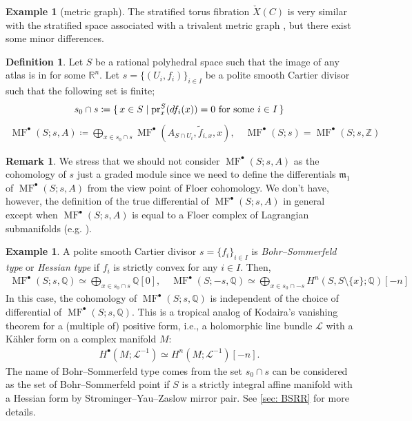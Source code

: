 \documentclass[a4paper,dvipdfmx,reqno,12pt]{amsart}
\theoremstyle{definition}
\newtheorem{Def}[Thm]{Definition}
\newtheorem{Eg}[Thm]{Example}
\newtheorem{Rmk}[Thm]{Remark}
\newcommand{\deq}{\coloneqq}
\newcommand{\R}{\mathbb{R}}%
\newcommand{\Q}{\mathbb{Q}}%
\newcommand{\Z}{\mathbb{Z}}%
\newcommand{\mcal}[1]{\mathcal{#1}}%
\newcommand{\mf}[1]{\mathfrak{#1}}%
\newcommand{\opn}[1]{\operatorname{#1}}
\numberwithin{equation}{section}
\begin{document}
\begin{Eg}[{metric graph}]
The stratified torus fibration $\check{X}(C)$ is very
similar with the stratified space associated
with a trivalent metric graph \cite{auroux2022lagrangian}, but
there exist some minor differences.
\end{Eg}

\begin{Def}
Let $S$ be a rational polyhedral space such that the image of
any atlas is in for some $\R^{n}$.
Let $s=\{(U_i,f_i)\}_{i\in I}$ be a polite smooth Cartier divisor such that
the following set is finite;
\begin{align}
s_0 \cap s\deq \set{x\in S\mid \opn{pr}_x^{S}(df_i(x))=0 
\text{ for some } i\in I}
\end{align}
\begin{align}
\opn{MF}^{\bullet}(S;s,A)\deq 
\bigoplus_{x\in s_0 \cap s} 
\opn{MF}^{\bullet}(A_{S\cap U_i},\tilde{f}_{i,x},x), \quad
\opn{MF}^{\bullet}(S;s)=\opn{MF}^{\bullet}(S;s,\Z)
\end{align}
\end{Def}



\begin{Rmk} \label{rmk: cartier module}
We stress that we should not consider 
$\opn{MF}^{\bullet}(S;s,A)$ as the cohomology of $s$ just
a graded module 
since we need to define the differentials $\mf{m}_1$ of 
$\opn{MF}^{\bullet}(S;s,A)$ from the view point of 
Floer cohomology. We don't have, however,
the definition of the true differential of 
$\opn{MF}^{\bullet}(S;s,A)$ in general except when
$\opn{MF}^{\bullet}(S;s,A)$ is equal to a Floer complex
of Lagrangian submanifolds (e.g. \cite[5.2]{MR1882331}).
\end{Rmk}

\begin{Eg} \label{eg: kodaira}
A polite smooth Cartier divisor $s=\{f_i\}_{i\in I}$ is 
\emph{Bohr--Sommerfeld type} or \emph{Hessian type} if
$f_i$ is strictly convex for any $i\in I$. Then,
\begin{align}
  \opn{MF}^{\bullet}(S;s,\Q)\simeq \bigoplus_{x\in s_0 \cap s} \Q[0], \quad
 \opn{MF}^{\bullet}(S;-s,\Q)\simeq \bigoplus_{x\in s_0\cap -s} 
H^{n}(S,S\setminus\{x\};\Q)[-n]
\end{align}
In this case, the cohomology of 
$\opn{MF}^{\bullet}(S;s,\Q)$ is independent of the choice of 
differential of $\opn{MF}^{\bullet}(S;s,\Q)$.
This is a tropical analog of Kodaira's vanishing theorem
for a (multiple of) positive form, i.e., a holomorphic line bundle $\mcal{L}$ with a 
K\"ahler form on a complex manifold $M$: 
\begin{align}
H^{\bullet}(M;\mcal{L}^{-1})\simeq H^{n}(M;\mcal{L}^{-1})[-n].
\end{align}
The name of Bohr--Sommerfeld type comes from 
the set $s_0\cap s$ can be considered as the set of 
Bohr--Sommerfeld point if $S$ is a strictly integral affine manifold 
with a Hessian form by Strominger--Yau--Zaslow mirror pair.
See \cref{sec: BSRR} for more details.
\end{Eg}
\end{document}
